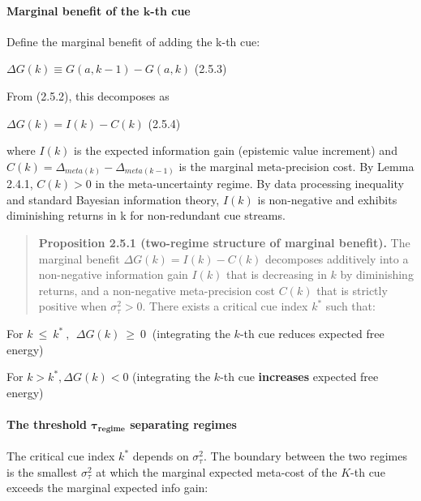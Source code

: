 \documentclass{article}
\begin{document}
\paragraph{\texorpdfstring{Marginal benefit of the \(\mathbf{k}\)-th
cue}{Marginal benefit of the \textbackslash mathbf\{k\}-th cue}}\label{marginal-benefit-of-the-mathbfk-th-cue}

Define the marginal benefit of adding the k-th cue:

\(\Delta G(k) \equiv G(a,k - 1) - G(a,k)\) (2.5.3)

From (2.5.2), this decomposes as

\(\Delta G(k) = I(k) - C(k)\) (2.5.4)

where \(I(k)\) is the expected information gain (epistemic value
increment) and \(C(k) = \Delta_{meta(k)} - \Delta_{meta(k - 1)}\) is the
marginal meta-precision cost. By Lemma 2.4.1, \(C(k) > 0\) in the
meta-uncertainty regime. By data processing inequality and standard
Bayesian information theory, \(I(k)\) is non-negative and exhibits
diminishing returns in k for non-redundant cue streams.

\begin{quote}
\textbf{Proposition 2.5.1 (two-regime structure of marginal benefit).}
The marginal benefit \(\Delta G(k) = I(k) - C(k)\) decomposes additively
into a non-negative information gain \(I(k)\) that is decreasing in
\(k\) by diminishing returns, and a non-negative meta-precision cost
\(C(k)\) that is strictly positive when \(\sigma_{\tau}^{2} > 0\). There
exists a critical cue index \(k^{*}\) such that:
\end{quote}

For \(k\  \leq \ k^{*}\ ,\ \ \Delta G(k)\  \geq \ 0\ \) (integrating the
\(k\)-th cue reduces expected free energy)

For \(k > k^{*},\Delta G(k) < 0\) (integrating the \(k\)-th cue
\textbf{increases} expected free energy)

\paragraph{\texorpdfstring{The threshold
\(\mathbf{\tau}_{\mathbf{regime}}\) separating
regimes}{The threshold \textbackslash mathbf\{\textbackslash tau\}\_\{\textbackslash mathbf\{regime\}\} separating regimes}}\label{the-threshold-mathbftau_mathbfregime-separating-regimes}

The critical cue index \(k^{*}\) depends on \(\sigma_{\tau}^{2}\). The
boundary between the two regimes is the smallest \(\sigma_{\tau}^{2}\)
at which the marginal expected meta-cost of the \(K\)-th cue exceeds the
marginal expected info gain:
\end{document}
